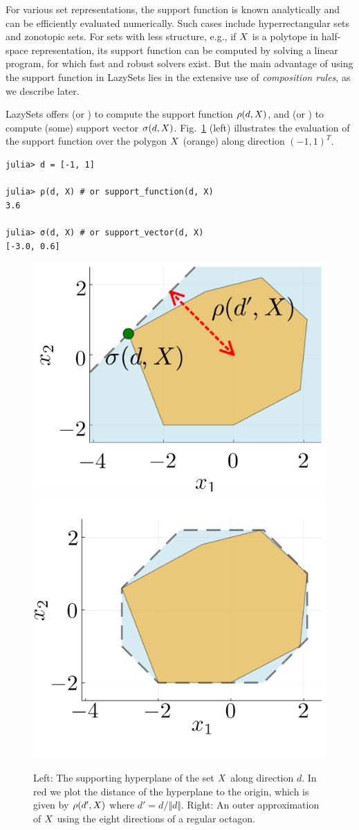 For various set representations, the support function is known analytically and can be efficiently evaluated numerically. Such cases include hyperrectangular sets and zonotopic sets.
%
For sets with less structure, e.g., if $X$ is a polytope in half-space representation, its support function can be computed by solving a linear program, for which fast and robust solvers exist.
%
But the main advantage of using the support function in LazySets lies in the extensive use of \emph{composition rules}, as we describe later.

\smallskip

LazySets offers  (or ) to compute the support function $\rho(d,X)$, and  (or ) to compute (some) support vector $\sigma(d,X)$. Fig.~\ref{fig:supfunc} (left) illustrates the evaluation of the support function over the polygon $X$ (orange) along direction $(-1, 1)^T$.

\begin{minipage}{\linewidth}
\vspace{-\abovedisplayskip}
\begin{lstlisting}
julia> d = [-1, 1]

julia> ρ(d, X) # or support_function(d, X)
3.6

julia> σ(d, X) # or support_vector(d, X)
[-3.0, 0.6]
\end{lstlisting}
\end{minipage}

\begin{figure}
	\centering
	\includegraphics[width=0.49\linewidth, keepaspectratio]{img/supfunc}
	\includegraphics[width=0.49\linewidth, keepaspectratio]{img/supfunc_oct}
	\vspace*{1mm}
	\caption{Left: The supporting hyperplane of the set $X$ along direction $d$.
	In red we plot the distance of the hyperplane to the origin, which is given by $\rho(d', X)$ where $d' = d / \Vert d \Vert$.
	Right: An outer approximation of $X$ using the eight directions of a regular octagon.}
	\label{fig:supfunc}
\end{figure}

